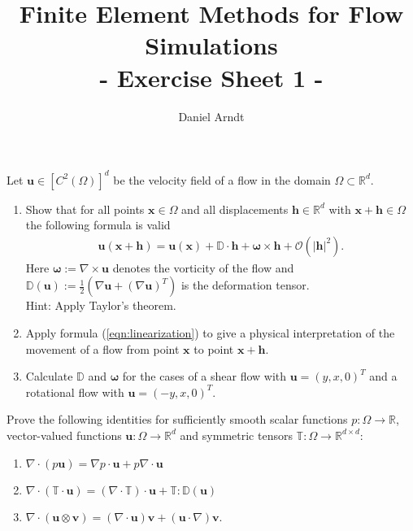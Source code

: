 \documentclass[12pt]{article}
\newcommand{\bh}{\boldsymbol{h}}
\newcommand{\bx}{\boldsymbol{x}}
\newcommand{\bu}{\boldsymbol{u}}
\newcommand{\bv}{\boldsymbol{v}}
\newcommand{\bomega}{\boldsymbol{\omega}}
\newenvironment{exercise}[2][Exercise]{\begin{trivlist}
\item[\hskip \labelsep {\bfseries #1}\hskip \labelsep {\bfseries #2.}]}{\end{trivlist}}
\begin{document}
 
\title{Finite Element Methods for Flow Simulations\\ - Exercise Sheet 1 -}
\author{Daniel Arndt}
\date{}
 
\maketitle

\begin{exercise}{1}
Let $\bu \in [C^2(\Omega)]^d$ be the velocity field of a flow in the domain $\Omega \subset \mathbb{R}^d$.
\begin{enumerate} 
 \item Show that for all points $\bx \in \Omega$ and all displacements $\bh \in \mathbb{R}^d$ 
       with $\bx + \bh \in \Omega$ the following formula is valid
       \begin{align}
       \label{eqn:linearization}
         \bu(\bx + \bh) = \bu(\bx) + \mathbb{D} \cdot \bh + \bomega \times \bh + \mathcal{O}(|\bh|^2).        
       \end{align}
       Here $\bomega := \nabla \times \bu$ denotes the vorticity of the flow and 
       $\mathbb{D}(\bu) := \frac12 (\nabla \bu + (\nabla \bu)^T)$ is the deformation tensor.\\
       Hint: Apply Taylor's theorem.
 \item Apply formula (\ref{eqn:linearization}) to give a physical interpretation of the movement of a flow 
       from point $\bx$ to point $\bx + \bh$.
 \item Calculate $\mathbb{D}$ and $\bomega$ for the cases of a shear flow with $\bu = (y,x,0)^T$ and a rotational flow with
$\bu = (-y,x,0)^T$.
\end{enumerate} 
\end{exercise}

\begin{exercise}{2}
Prove the following identities for sufficiently smooth scalar functions $p: \Omega \to \mathbb{R}$, vector-valued functions
$\boldsymbol{u}: \Omega \to \mathbb{R}^d$ and symmetric tensors $\mathbb{T} : \Omega \to \mathbb{R}^{d\times d}$:
\begin{enumerate}
 \item $\nabla \cdot (p\bu) = \nabla p \cdot \bu + p \nabla \cdot \bu$
 \item $\nabla \cdot (\mathbb{T} \cdot \bu) = (\nabla \cdot \mathbb{T}) \cdot \bu + \mathbb{T} : \mathbb{D}(\bu)$
 \item $\nabla \cdot (\bu \otimes \bv) = (\nabla \cdot \bu) \bv + (\bu \cdot \nabla)\bv$.
\end{enumerate}
\end{exercise} 
\end{document}
